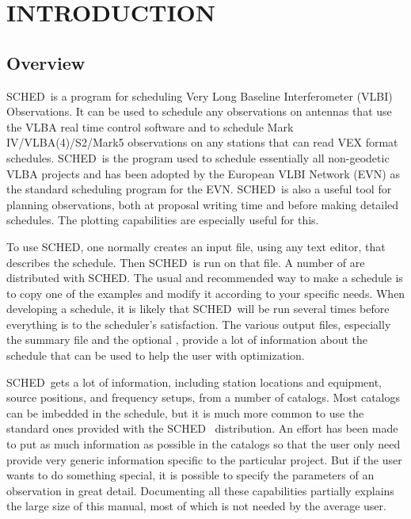 \documentclass{report}
\newcommand{\sched}{{\sc SCHED}}
\newcommand{\schedb}{{\sc SCHED~}}
\begin{document}
\newpage

\chapter{\label{CHP:INTRO}INTRODUCTION}

\section{\label{SEC:INTRO}Overview}

\schedb is a program for scheduling Very Long Baseline Interferometer
(VLBI) Observations.  It can be used to schedule any observations on
antennas that use the VLBA real time control software and to schedule
Mark IV/VLBA(4)/S2/Mark5 observations on any stations that can read
VEX format schedules.  \schedb is the program used to schedule
essentially all non-geodetic VLBA projects and has been adopted by the
European VLBI Network (EVN) as the standard scheduling program for the
EVN.  \schedb is also a useful tool for planning observations, both at
proposal writing time and before making detailed schedules.  The
plotting capabilities are especially useful for this.

To use \sched, one normally creates an input file, using any text
editor, that describes the schedule.  Then \schedb is run on that
file.  A number of  are distributed
with \sched.  The usual and recommended way to make a schedule is to
copy one of the examples and modify it according to your specific
needs.  When developing a schedule, it is likely that \schedb will be
run several times before everything is to the scheduler's
satisfaction.  The various output files, especially the summary file
and the optional , provide a lot of
information about the schedule that can be used to help the user with
optimization.

\schedb gets a lot of information, including station locations and
equipment, source positions, and frequency setups, from a number of
catalogs.  Most catalogs can be imbedded in the schedule, but it is
much more common to use the standard ones provided with the \schedb
distribution.  An effort has been made to put as much information as
possible in the catalogs so that the user only need provide very
generic information specific to the particular project.  But if the
user wants to do something special, it is possible to specify the
parameters of an observation in great detail.  Documenting all these
capabilities partially explains the large size of this manual, most
of which is not needed by the average user.
\end{document}
